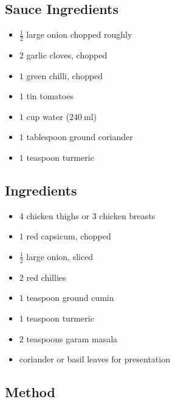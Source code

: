 \documentclass[11pt,a4paper]{article}
\begin{document}
\begin{multicols}{2}

\subsection*{Sauce Ingredients}

\begin{itemize}
  \item $ \frac{1}{2} $ large onion chopped roughly
  \item $ 2 $ garlic cloves, chopped
  \item $ 1 $ green chilli, chopped
  \item $ 1 $ tin tomatoes
  \item $ 1 $ cup water ($ \qty{240}{\ml} $)
  \item $ 1 $ tablespoon ground coriander
  \item $ 1 $ teaspoon turmeric
\end{itemize}

\columnbreak{}

\subsection*{Ingredients}

\begin{itemize}
  \item $ 4 $ chicken thighs or $3 $ chicken breasts
  \item $ 1 $ red capsicum, chopped
  \item $ \frac{1}{2} $ large onion, sliced
  \item $ 2 $ red chillies
  \item $ 1 $ teaspoon ground cumin
  \item $ 1 $ teaspoon turmeric
  \item $ 2 $ teaspoons garam masala
  \item coriander or basil leaves for presentation
\end{itemize}

\end{multicols}

\medskip

\subsection*{Method}
\end{document}
